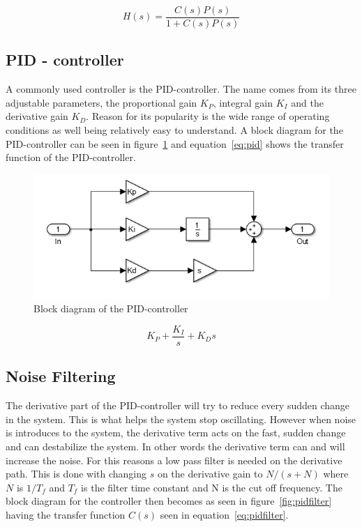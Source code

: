 \begin{equation}
\label{eq:tfsystem}
H(s) = \dfrac{C(s)P(s)}{1+C(s)P(s)}
\end{equation}


\subsection{PID - controller}
 A commonly used controller is the PID-controller\cite{feedback}. The name comes from its three adjustable parameters, the proportional gain $K_{P}$, integral gain $K_{I}$ and the derivative gain $K_{D}$. Reason for its popularity is the wide range of operating conditions as well being relatively easy to understand.
 A block diagram for the PID-controller can be seen in figure~\ref{fig:pidblock} and equation~\ref{eq:pid} shows the transfer function of the PID-controller.  

\begin{figure}[!h]
	\centering
	\includegraphics[width=.7\linewidth]{graphics/pidcontroller}
	\caption{Block diagram of the PID-controller}
	\label{fig:pidblock}
\end{figure}

\begin{equation}
\label{eq:pid}
K_P + \dfrac{K_I}{s} +K_D s
\end{equation}

\subsection{Noise Filtering}

The derivative part of the PID-controller will try to reduce every sudden change in the system. This is what helps the system stop oscillating. However when noise is introduces to the system, the derivative term acts on the fast, sudden change and can destabilize the system. In other words the derivative term can and will increase the noise. For this reasons a low pass filter is needed on the derivative path. This is done with changing $s$ on the derivative gain to $N/(s + N)$ where $N$ is $1/T_f$ and $T_f$ is the filter time constant and N is the cut off frequency. The block diagram for the controller then becomes as seen in figure~\ref{fig:pidfilter} having the transfer function $C(s)$ seen in equation~\ref{eq:pidfilter}.

